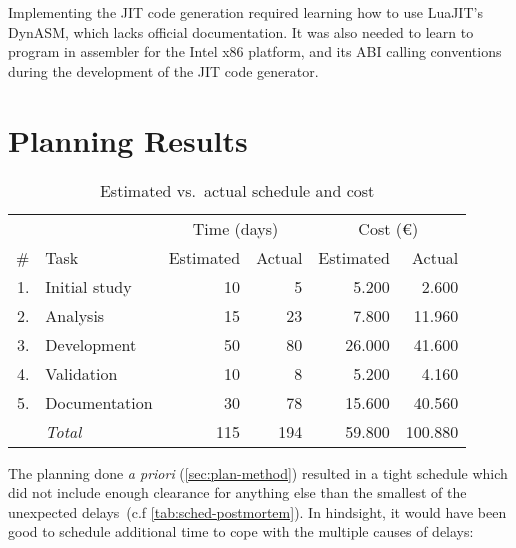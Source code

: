 Implementing the JIT code generation required learning how to use LuaJIT's
DynASM, which lacks official documentation. It was also needed to learn to
program in assembler for the Intel x86 platform, and its \gls{ABI} calling
conventions during the development of the JIT code generator.


\section{Planning Results}

\begin{table}[ht]
	\centering
	\begin{tabular}{rlrrrr}
		\toprule
		& & \multicolumn{2}{c}{Time (days)} & \multicolumn{2}{c}{Cost (€)} \\
		\cmidrule(r){3-6}
		\# & Task & Estimated  & Actual  & Estimated & Actual \\
		\midrule
		1. & Initial study     & 10 &  5 &  5.200 &  2.600 \\
		2. & Analysis          & 15 & 23 &  7.800 & 11.960 \\
		3. & Development       & 50 & 80 & 26.000 & 41.600 \\
		4. & Validation        & 10 &  8 &  5.200 &  4.160 \\
		5. & Documentation     & 30 & 78 & 15.600 & 40.560 \\
		\midrule
		  & \emph{Total}      & 115 & 194& 59.800 & 100.880 \\
		\bottomrule
	\end{tabular}
	\caption{Estimated vs.\ actual schedule and cost}
	\label{tab:sched-postmortem}
\end{table}

The planning done \emph{a priori} (\autoref{sec:plan-method}) resulted in a
tight schedule which did not include enough clearance for anything else than
the smallest of the unexpected delays~(c.f \autoref{tab:sched-postmortem}).
In hindsight, it would have been good to schedule additional time to cope
with the multiple causes of delays:

